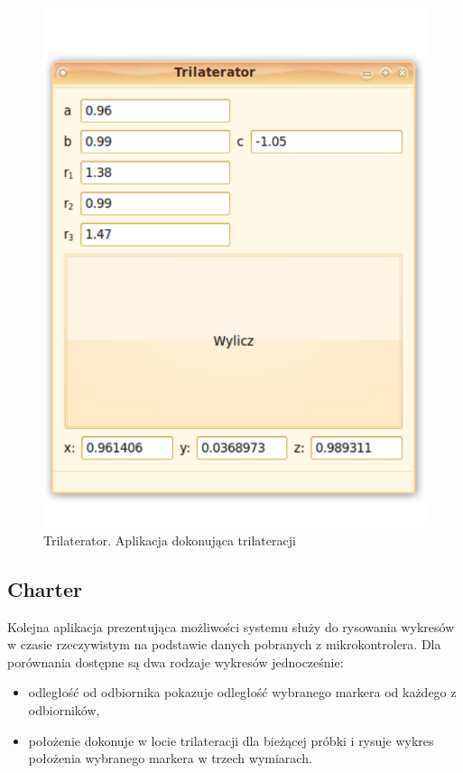 \begin{figure}
 \includegraphics[width=\textwidth]{gfx/trilaterator}
 \caption{Trilaterator. Aplikacja dokonująca trilateracji}
 \label{fig:trilaterator}
\end{figure}

\subsection{Charter}
Kolejna aplikacja prezentująca możliwości systemu służy do rysowania wykresów w czasie rzeczywistym na podstawie danych pobranych z mikrokontrolera. Dla porównania dostępne są dwa rodzaje wykresów jednocześnie:
\begin{itemize}
 \item odległość od odbiornika \ppauza pokazuje odległość wybranego markera od każdego z odbiorników,
 \item położenie \ppauza dokonuje w locie trilateracji dla bieżącej próbki i rysuje wykres położenia wybranego markera w trzech wymiarach.
\end{itemize}

